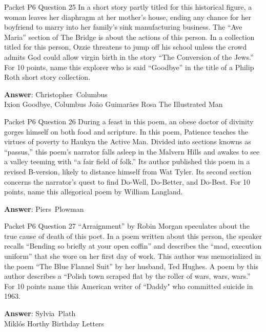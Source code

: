 \begin{frame}{Packet P6 Question 25}
In a short story partly titled for this historical figure, a woman leaves her diaphragm   at her mother's house, ending any chance for her boyfriend to marry into her family's sink manufacturing business. The “Ave Maria” section of The Bridge is about the actions of this person. In a collection titled for this person, Ozzie threatens to jump off his school unless the crowd admits God could allow virgin birth in the story “The Conversion of the Jews.” For 10 points, name this explorer who is said “Goodbye” in the title of a Philip Roth short   story collection.    

\textbf{Answer}: Christopher\ Columbus\\
 Ixion
 Goodbye, Columbus
 João Guimarães Rosa
 The Illustrated Man
\end{frame}

\begin{frame}{Packet P6 Question 26}
During a feast in this poem, an obese doctor of divinity gorges himself on both food and scripture. In this poem, Patience teaches the virtues of poverty to Haukyn the Active Man. Divided into sections knowns as “passus,”   this poem’s narrator falls asleep in the Malvern Hills and awakes   to see a valley   teeming with “a fair field of folk.” Its author published this poem in a revised B-version, likely to distance himself from Wat Tyler. Its second section concerns the narrator’s quest to find Do-Well, Do-Better, and Do-Best.   For 10 points, name this allegorical poem by William Langland.

\textbf{Answer}: Piers\ Plowman\\
\end{frame}

\begin{frame}{Packet P6 Question 27}
“Arraignment” by Robin   Morgan speculates about the true cause of death of this poet. In a poem written about this person, the speaker recalls “Bending so briefly at your open coffin” and describes the “mad, execution uniform” that she wore on her first day of work. This author was memorialized in the poem “The Blue Flannel Suit” by her husband,   Ted Hughes. A poem       by this author describes a “Polish town scraped flat by the roller of wars, wars, wars.” For 10 points name this American writer of “Daddy" who committed suicide in 1963.

\textbf{Answer}: Sylvia\ Plath\\
 Miklós Horthy
 Birthday Letters
\end{frame}

